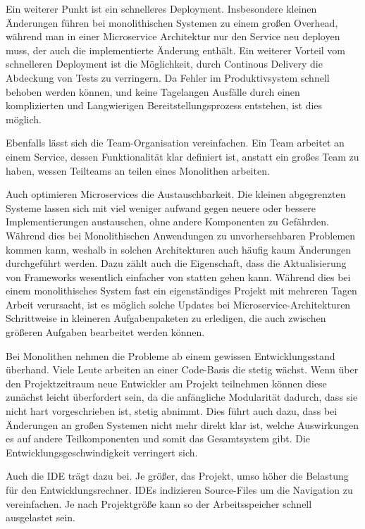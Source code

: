 \documentclass[12pt,a4paper,bibliography=totocnumbered,listof=totocnumbered]{scrartcl}
\begin{document}

Ein weiterer Punkt ist ein schnelleres Deployment. Insbesondere kleinen Änderungen führen bei monolithischen Systemen zu einem großen Overhead, während man in einer Microservice Architektur nur den Service neu deployen muss, der auch die implementierte Änderung enthält. Ein weiterer Vorteil vom schnelleren Deployment ist die Möglichkeit, durch Continous Delivery die Abdeckung von Tests zu verringern. Da Fehler im Produktivsystem schnell behoben werden können, und keine Tagelangen Ausfälle durch einen komplizierten und Langwierigen Bereitstellungsprozess entstehen, ist dies möglich.

Ebenfalls lässt sich die Team-Organisation vereinfachen. Ein Team arbeitet an einem Service, dessen Funktionalität klar definiert ist, anstatt ein großes Team zu haben, wessen Teilteams an teilen eines Monolithen arbeiten.

Auch optimieren Microservices die Austauschbarkeit. Die kleinen abgegrenzten Systeme lassen sich mit viel weniger aufwand gegen neuere oder bessere Implementierungen austauschen, ohne andere Komponenten zu Gefährden. Während dies bei Monolithischen Anwendungen zu unvorhersehbaren Problemen kommen kann, weshalb in solchen Architekturen auch häufig kaum Änderungen durchgeführt werden. Dazu zählt auch die Eigenschaft, dass die Aktualisierung von Frameworks wesentlich einfacher von statten gehen kann. Während dies bei einem monolithisches System fast ein eigenständiges Projekt mit mehreren Tagen Arbeit verursacht, ist es möglich solche Updates bei Microservice-Architekturen Schrittweise in kleineren Aufgabenpaketen zu erledigen, die auch zwischen größeren Aufgaben bearbeitet werden können.

Bei Monolithen  nehmen die Probleme ab einem gewissen Entwicklungsstand überhand. Viele Leute arbeiten an einer Code-Basis die stetig wächst. Wenn über den Projektzeitraum neue Entwickler am Projekt teilnehmen können diese zunächst leicht überfordert sein, da die anfängliche Modularität dadurch, dass sie nicht hart vorgeschrieben ist, stetig abnimmt. Dies führt auch dazu, dass bei Änderungen an großen Systemen nicht mehr direkt klar ist, welche Auswirkungen es auf andere Teilkomponenten und somit das Gesamtsystem gibt. Die Entwicklungsgeschwindigkeit verringert sich.

Auch die IDE trägt dazu bei. Je größer, das Projekt, umso höher die Belastung für den Entwicklungsrechner. IDEs indizieren Source-Files um die Navigation zu vereinfachen. Je nach Projektgröße kann so der Arbeitsspeicher schnell ausgelastet sein.
\end{document}
